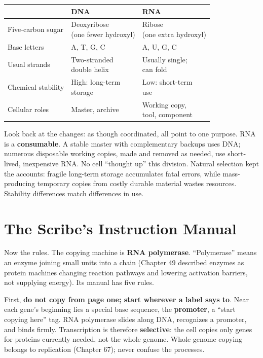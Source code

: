 \begin{table}[htbp]
\centering
\begin{tabular}{lll}
\toprule
 & DNA & RNA \\
\midrule
Five-carbon sugar & \shortstack[l]{Deoxyribose\\(one fewer hydroxyl)} & \shortstack[l]{Ribose\\(one extra hydroxyl)} \\
Base letters & A, T, G, C & A, U, G, C \\
Usual strands & \shortstack[l]{Two-stranded\\double helix} & \shortstack[l]{Usually single;\\can fold} \\
Chemical stability & \shortstack[l]{High: long-term\\storage} & \shortstack[l]{Low: short-term\\use} \\
Cellular roles & Master, archive & \shortstack[l]{Working copy,\\tool, component} \\
\bottomrule
\end{tabular}
\end{table}

Look back at the changes: as though coordinated, all point to one purpose. RNA is a \textbf{consumable}. A stable master with complementary backups uses DNA; numerous disposable working copies, made and removed as needed, use short-lived, inexpensive RNA. No cell ``thought up'' this division. Natural selection kept the accounts: fragile long-term storage accumulates fatal errors, while mass-producing temporary copies from costly durable material wastes resources. Stability differences match differences in use.

\section{The Scribe's Instruction Manual}

Now the rules. The copying machine is \textbf{RNA polymerase}. ``Polymerase'' means an enzyme joining small units into a chain (Chapter 49 described enzymes as protein machines changing reaction pathways and lowering activation barriers, not supplying energy). Its manual has five rules.

First, \textbf{do not copy from page one; start wherever a label says to}. Near each gene's beginning lies a special base sequence, the \textbf{promoter}, a ``start copying here'' tag. RNA polymerase slides along DNA, recognizes a promoter, and binds firmly. Transcription is therefore \textbf{selective}: the cell copies only genes for proteins currently needed, not the whole genome. Whole-genome copying belongs to replication (Chapter 67); never confuse the processes.

